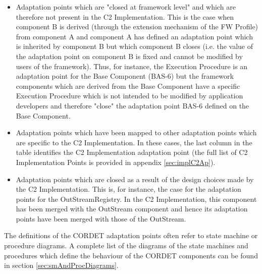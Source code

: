 \documentclass{pnp_article}
\begin{document}
\begin{itemize}
\item Adaptation points which are "closed at framework level" and which are therefore not present in the C2 Implementation. This is the case when component B is derived (through the extension mechanism of the FW Profile) from component A and component A has defined an adaptation point which is inherited by component B but which component B closes (i.e. the value of the adaptation point on component B is fixed and cannot be modified by users of the framework). Thus, for instance, the Execution Procedure is an adaptation point for the Base Component (BAS-6) but the framework components which are derived from the Base Component have a specific Execution Procedure which is not intended to be modified by application developers and therefore "close" the adaptation point BAS-6 defined on the Base Component.
\item Adaptation points which have been mapped to other adaptation points which are specific to the C2 Implementation. In these cases, the last column in the table identifies the C2 Implementation adaptation point (the full list of C2 Implementation Points is provided in appendix \ref{sec:implC2Ap}).
\item Adaptation points which are closed as a result of the design choices made by the C2 Implementation. This is, for instance, the case for the adaptation points for the OutStreamRegistry. In the C2 Implementation, this component has been merged with the OutStream component and hence its adaptation points have been merged with those of the OutStream.
\end{itemize}

The definitions of the CORDET adaptation points often refer to state machine or procedure diagrams. A complete list of the diagrams of the state machines and procedures which define the behaviour of the CORDET components can be found in section \ref{sec:smAndProcDiagrams}.


\begin{landscape}


\end{landscape}
\end{document}
